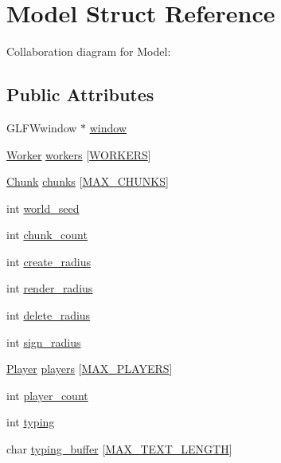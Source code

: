 \hypertarget{structModel}{}\section{Model Struct Reference}
\label{structModel}


Collaboration diagram for Model\+:
\subsection*{Public Attributes}
\begin{DoxyCompactItemize}
\item 
G\+L\+F\+Wwindow $\ast$ \hyperlink{structModel_af15f84653ef65888f996e6b78c1d6ff7}{window}
\item 
\hyperlink{structWorker}{Worker} \hyperlink{structModel_af82468267fcf9f7720dd378e0a46bad7}{workers} \mbox{[}\hyperlink{main_8c_a9e7244aa346409fc55b405b70d87f774}{W\+O\+R\+K\+E\+RS}\mbox{]}
\item 
\hyperlink{structChunk}{Chunk} \hyperlink{structModel_a454955bd2cbb283c269a5189d29b6362}{chunks} \mbox{[}\hyperlink{main_8c_a9e879c11aa15653382faa681060e6179}{M\+A\+X\+\_\+\+C\+H\+U\+N\+KS}\mbox{]}
\item 
int \hyperlink{structModel_a61caead581f113d0c540e578c323ab34}{world\+\_\+seed}
\item 
int \hyperlink{structModel_ac890daa53d9fca686f850c61707534d3}{chunk\+\_\+count}
\item 
int \hyperlink{structModel_ab285f5b424f0989de991724b7842f7ee}{create\+\_\+radius}
\item 
int \hyperlink{structModel_a78738d6f90d8a11202fec26912dddcde}{render\+\_\+radius}
\item 
int \hyperlink{structModel_a424db0f8c4b9225fc177664d0564b9f6}{delete\+\_\+radius}
\item 
int \hyperlink{structModel_a27a1d8e175370c2b238acb4e6f68e9b7}{sign\+\_\+radius}
\item 
\hyperlink{structPlayer}{Player} \hyperlink{structModel_a35889c6e0321e390c7cc35678b561f0c}{players} \mbox{[}\hyperlink{main_8c_a1c346c944e8204fd06dc057393c7c96d}{M\+A\+X\+\_\+\+P\+L\+A\+Y\+E\+RS}\mbox{]}
\item 
int \hyperlink{structModel_aaf87a246b0eaba7090708cbf06265948}{player\+\_\+count}
\item 
int \hyperlink{structModel_a2fcef6db45ecfe5abca7e531c3edd58d}{typing}
\item 
char \hyperlink{structModel_a69f3bc4862cb7190f7d28013da4fe629}{typing\+\_\+buffer} \mbox{[}\hyperlink{main_8c_a9a90baeac9b3273d185357200b599b39}{M\+A\+X\+\_\+\+T\+E\+X\+T\+\_\+\+L\+E\+N\+G\+TH}\mbox{]}

\end{DoxyCompactItemize}
